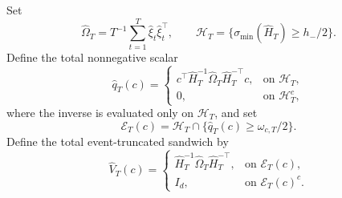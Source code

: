 Set
\[
 \widehat\Omega_T=T^{-1}\sum_{t=1}^T\widehat\xi_t\widehat\xi_t^\top,
 \qquad
 \mathcal H_T=\{\sigma_{\min}(\widehat H_T)\ge h_-/2\}.
\]
Define the total nonnegative scalar
\[
 \widehat q_T(c)=
 \begin{cases}
 c^\top\widehat H_T^{-1}\widehat\Omega_T\widehat H_T^{-\top}c,
   &\text{on }\mathcal H_T,\\
 0,&\text{on }\mathcal H_T^c,
 \end{cases}
\]
where the inverse is evaluated only on \(\mathcal H_T\), and set
\[
 \mathcal E_T(c)=\mathcal H_T\cap\{\widehat q_T(c)\ge\omega_{c,T}/2\}.
\]
Define the total event-truncated sandwich by
\[
 \widehat V_T(c)=
 \begin{cases}
 \widehat H_T^{-1}\widehat\Omega_T\widehat H_T^{-\top},
   &\text{on }\mathcal E_T(c),\\
 I_d,&\text{on }\mathcal E_T(c)^c.
 \end{cases}
\]